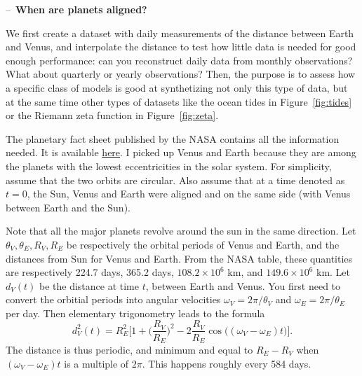 \documentclass[oneside,10pt]{book}
\begin{document}
\begin{Exercise} -- \,{\bf When are planets aligned?}

\noindent We first create a dataset with daily measurements of the distance between Earth and Venus, and interpolate the distance to test how little data is needed for good enough performance: can you reconstruct daily data from monthly observations? What about quarterly or yearly observations? Then, the purpose is to assess how a specific class of models is good at synthetizing not only this type of data, but at the same time other types of datasets like the ocean tides in Figure~\ref{fig:tides} or the Riemann zeta function in
 Figure~\ref{fig:zeta}.

The planetary fact sheet published by the NASA contains all the information needed.
It is available \href{https://nssdc.gsfc.nasa.gov/planetary/factsheet/}{here}. I picked up Venus and Earth because they are among the planets with the lowest eccentricities in the solar system. For simplicity, assume that the two orbits are circular. Also assume that at a time denoted as $t=0$, the Sun, Venus and Earth were aligned and on the same side (with Venus between Earth and the Sun).

Note that all the major planets revolve around the sun in the same direction.
Let $\theta_V, \theta_E, R_V, R_E$ be respectively the orbital periods of Venus and Earth, and the  distances from Sun for Venus and Earth.  From the NASA table, these quantities are respectively 224.7 days, 365.2 days, $108.2\times 10^6$ km, and
$149.6  \times 10^6$ km. Let $d_V(t)$ be the distance at time $t$, between Earth and Venus. You first need to convert the orbitial periods into angular velocities
 $\omega_V = 2\pi/\theta_V$ and $\omega_E = 2\pi/\theta_E$ per day.  Then elementary trigonometry leads to the formula
\begin{equation}
d_V^2(t) = R_E^2\Bigg[1 + \Big(\frac{R_V}{R_E}\Big)^2 -2\frac{R_V}{R_E} \cos\Big((\omega_V-\omega_E)t\Big) \Bigg]. \label{resw}
\end{equation}
The distance is thus periodic, and minimum and equal to $R_E - R_V$ when
$(\omega_V-\omega_E)t$ is a multiple of $2\pi$. This happens roughly every 584 days.




\end{Exercise}
\end{document}
